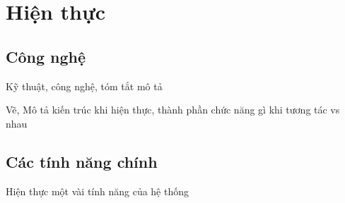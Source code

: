 \section{Hiện thực}
\subsection{Công nghệ}
Kỹ thuật, công nghệ, tóm tắt mô tả

Vẽ, Mô tả kiến trúc khi hiện thực, thành phần chức năng gì khi tương tác vs nhau
\subsection{Các tính năng chính}
Hiện thực một vài tính năng của hệ thống

